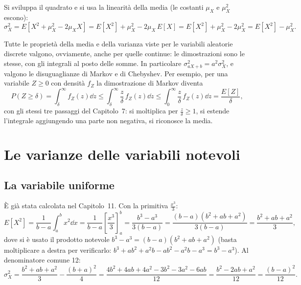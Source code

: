 
\begin{dimostrazione}
\passo{} Si sviluppa il quadrato e si usa la linearità della media (le costanti $\mu_X$ e $\mu_X^2$ escono):
\[ \sigma_X^2 = E\left[ X^2 + \mu_X^2 - 2\mu_X X \right] = E[X^2] + \mu_X^2 - 2\mu_X\, E[X] = E[X^2] + \mu_X^2 - 2\mu_X^2
   = E[X^2] - \mu_X^2 . \]
\end{dimostrazione}

Tutte le proprietà della media e della varianza viste per le variabili aleatorie discrete valgono, ovviamente, anche per
quelle continue: le dimostrazioni sono le stesse, con gli integrali al posto delle somme. In particolare
$\sigma_{aX + b}^2 = a^2 \sigma_X^2$, e valgono le disuguaglianze di Markov e di Chebyshev. Per esempio, per una variabile
$Z \geq 0$ con densità $f_Z$ la dimostrazione di Markov diventa
\[ P(Z \geq \delta) = \int_{\delta}^{\infty} f_Z(z) \dd z \leq \int_{\delta}^{\infty} \frac{z}{\delta}\, f_Z(z) \dd z \leq
   \int_0^{\infty} \frac{z}{\delta}\, f_Z(z) \dd z = \frac{E[Z]}{\delta} , \]
con gli stessi tre passaggi del Capitolo~7: si moltiplica per $\frac{z}{\delta} \geq 1$, si estende l'integrale aggiungendo
una parte non negativa, si riconosce la media.

\section{Le varianze delle variabili notevoli}

\subsection{La variabile uniforme}


\begin{dimostrazione}
 È già stata calcolata nel Capitolo~11.
 Con la primitiva $\frac{x^3}{3}$:
\[ E[X^2] = \frac{1}{b - a} \int_a^b x^2 \dd x = \frac{1}{b - a} \left[ \frac{x^3}{3} \right]_a^b = \frac{b^3 - a^3}{3(b -
   a)} = \frac{(b - a)(b^2 + ab + a^2)}{3(b - a)} = \frac{b^2 + ab + a^2}{3} , \]
dove si è usato il prodotto notevole $b^3 - a^3 = (b - a)(b^2 + ab + a^2)$ (basta moltiplicare a destra per verificarlo:
$b^3 + ab^2 + a^2 b - ab^2 - a^2 b - a^3 = b^3 - a^3$).
 Al denominatore comune 12:
\[
  \sigma_X^2 = \frac{b^2 + ab + a^2}{3} - \frac{(b + a)^2}{4} = \frac{4b^2 + 4ab + 4a^2 - 3b^2 - 3a^2 - 6ab}{12}
  = \frac{b^2 - 2ab + a^2}{12} = \frac{(b - a)^2}{12} .
\]
\end{dimostrazione}

